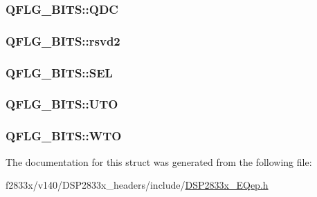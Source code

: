 \subsubsection[{Q\+D\+C}]{ Q\+F\+L\+G\+\_\+\+B\+I\+T\+S\+::\+Q\+D\+C}\label{struct_q_f_l_g___b_i_t_s_a5fc6f9e01268e98261be1728e3c7da68}
\hypertarget{struct_q_f_l_g___b_i_t_s_a1e1f172ba3fa329a8095c4fd209cf5f4}{}
\subsubsection[{rsvd2}]{ Q\+F\+L\+G\+\_\+\+B\+I\+T\+S\+::rsvd2}\label{struct_q_f_l_g___b_i_t_s_a1e1f172ba3fa329a8095c4fd209cf5f4}
\hypertarget{struct_q_f_l_g___b_i_t_s_aaf892d64e7f88bef637a8957c0420af3}{}
\subsubsection[{S\+E\+L}]{ Q\+F\+L\+G\+\_\+\+B\+I\+T\+S\+::\+S\+E\+L}\label{struct_q_f_l_g___b_i_t_s_aaf892d64e7f88bef637a8957c0420af3}
\hypertarget{struct_q_f_l_g___b_i_t_s_a3e9f20ef95fa40f16985a509802e1e3e}{}
\subsubsection[{U\+T\+O}]{ Q\+F\+L\+G\+\_\+\+B\+I\+T\+S\+::\+U\+T\+O}\label{struct_q_f_l_g___b_i_t_s_a3e9f20ef95fa40f16985a509802e1e3e}
\hypertarget{struct_q_f_l_g___b_i_t_s_aa06da50af17439bae3518a8c2bd9fee4}{}
\subsubsection[{W\+T\+O}]{ Q\+F\+L\+G\+\_\+\+B\+I\+T\+S\+::\+W\+T\+O}\label{struct_q_f_l_g___b_i_t_s_aa06da50af17439bae3518a8c2bd9fee4}


The documentation for this struct was generated from the following file\+:\begin{DoxyCompactItemize}
\item 
f2833x/v140/\+D\+S\+P2833x\+\_\+headers/include/\hyperlink{_d_s_p2833x___e_qep_8h}{D\+S\+P2833x\+\_\+\+E\+Qep.\+h}\end{DoxyCompactItemize}
